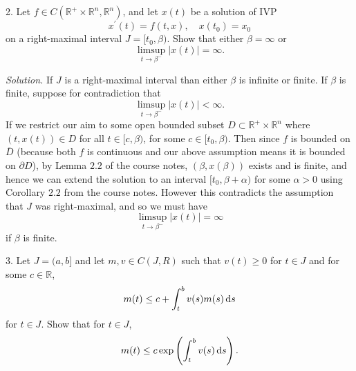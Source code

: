\documentclass{article}
\newcommand{\R}{\mathbb{R}}
\begin{document}
\newpage

2. Let $f \in C(\R^+ \times \R^n, \R^n)$, and let $x(t)$ be a solution of IVP
%
\begin{equation*}
    x^\prime(t) = f(t, x), \quad x(t_0) = x_0
\end{equation*}
%
on a right-maximal interval $J = [t_0, \beta)$. Show that either $\beta = \infty$
or
%
\begin{equation*}
    \limsup_{t \to \beta^-} |x(t)| = \infty.
\end{equation*}

\textit{Solution.}
If $J$ is a right-maximal interval than either $\beta$ is infinite or finite.
If $\beta$ is finite, suppose for contradiction that
%
\begin{equation*}
    \limsup_{t \to \beta^-} |x(t)| < \infty.
\end{equation*}
%
If we restrict our aim to some open bounded subset $D \subset \R^+ \times \R^n$ where
$(t, x(t)) \in D$ for all $t \in [c, \beta)$, for some $c \in [t_0, \beta)$.
Then since $f$ is bounded on $\overline{D}$ (because both $f$ is continuous and our above
assumption means it is bounded on $\partial D$), by Lemma $2.2$ of the course notes,
$(\beta, x(\beta))$ exists and is finite, and hence
we can extend the solution to an interval $[t_0, \beta + \alpha)$ for some
$\alpha > 0$ using Corollary $2.2$ from the course notes. However this contradicts the assumption
that $J$ was right-maximal, and so we must have
%
\begin{equation*}
    \limsup_{t \to \beta^-} |x(t)| = \infty
\end{equation*}
%
if $\beta$ is finite.

\newpage

3. Let $J = (a, b]$ and let $m, v \in C(J, R)$ such that $v(t) \geq 0$ for
$t \in J$ and for some $c \in \R$,
%
\begin{equation*}
    m(t) \leq c + \int_t^b v(s) m(s) \dif s
\end{equation*}
%
for $t \in J$. Show that for $t \in J$,
%
\begin{equation*}
    m(t) \leq c \exp\del{\int_t^b v(s) \dif s}.
\end{equation*}
\end{document}
